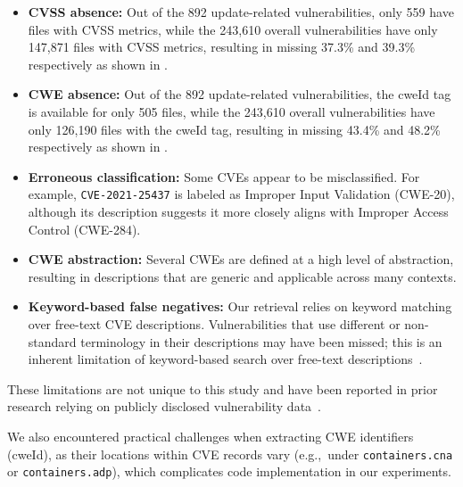 \documentclass[fleqn,s1,names,tex]{neptune}
\begin{document}
\begin{itemize}
    \item
    \textbf{CVSS absence:}
    Out of the 892 update-related vulnerabilities, %
    only 559 have files with CVSS metrics,
    while the 243,610  overall vulnerabilities have only 147,871 files with CVSS metrics, 
    resulting in missing 37.3\% and 39.3\% respectively as shown in  .
    
    \item \textbf{CWE absence:} 
    Out of the 892 update-related vulnerabilities, the cweId tag is available for only 505 files,
    while the  243,610  overall vulnerabilities have only 126,190 files with the cweId tag, 
    resulting in missing 43.4\% and 48.2\% respectively as shown in  .


    \item \textbf{Erroneous classification:}
    Some CVEs appear to be misclassified. For example, \texttt{CVE-2021-25437} is labeled as Improper Input Validation (CWE-20), although its description suggests it more closely aligns with Improper Access Control (CWE-284).


    
    \item \textbf{CWE abstraction:}  
    Several CWEs are defined at a high level of abstraction, resulting in descriptions that are generic and applicable across many contexts.

    \item \textbf{Keyword-based false negatives:}
    Our retrieval relies on keyword matching over free-text CVE descriptions.
    Vulnerabilities that use different or non-standard terminology in their
  descriptions may have been missed; this is an inherent
  limitation of keyword-based search over free-text
  descriptions~\citep{9723604}.

    

\end{itemize}


These limitations are not unique to this study and have been reported in prior
research relying on publicly disclosed vulnerability
data~\citep{280002,10.1007/978-3-031-62139-0_9,10.1145/3634737.3657012}. 


We also encountered practical challenges when extracting CWE identifiers (cweId), as their locations within CVE records vary (e.g.,~under \texttt{containers.cna} or \texttt{containers.adp}), which complicates code implementation in our experiments.
\end{document}
